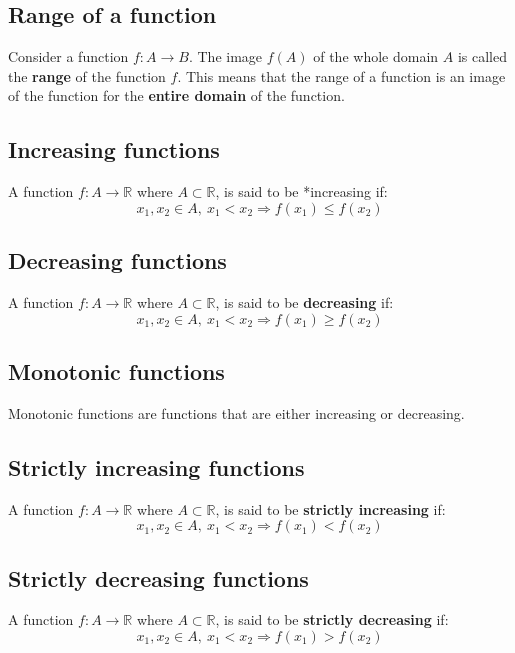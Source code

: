 \documentclass[11pt]{article}
\begin{document}
\subsection{Range of a function}
\label{sec:orgd5c168e}
Consider a function \(f : A \rightarrow B\). The image \(f(A)\) of the whole domain \(A\) is called the \textbf{range} of the function \(f\). This means that the range of a function is an image of the function for the \textbf{entire domain} of the function.

\subsection{Increasing functions}
\label{sec:orgc3ed40e}
A function \(f : A \rightarrow \mathbb{R}\) where \(A \subset \mathbb{R}\), is said to be *increasing if:
\[x_1, x_2 \in A, \  x_1 < x_2 \Rightarrow f(x_1) \le f(x_2)\]

\subsection{Decreasing functions}
\label{sec:org6ff125f}
A function \(f : A \rightarrow \mathbb{R}\) where \(A \subset \mathbb{R}\), is said to be \textbf{decreasing} if:
\[x_1, x_2 \in A, \  x_1 < x_2 \Rightarrow f(x_1) \ge f(x_2)\]

\subsection{Monotonic functions}
\label{sec:org5e0b36f}
Monotonic functions are functions that are either increasing or decreasing.

\subsection{Strictly increasing functions}
\label{sec:org20ee6e6}
A function \(f : A \rightarrow \mathbb{R}\) where \(A \subset \mathbb{R}\), is said to be \textbf{strictly increasing} if:
\[x_1, x_2 \in A, \  x_1 < x_2 \Rightarrow f(x_1) < f(x_2)\]

\subsection{Strictly decreasing functions}
\label{sec:org04a6e21}
A function \(f : A \rightarrow \mathbb{R}\) where \(A \subset \mathbb{R}\), is said to be \textbf{strictly decreasing} if:
\[x_1, x_2 \in A, \  x_1 < x_2 \Rightarrow f(x_1) > f(x_2)\]
\end{document}

